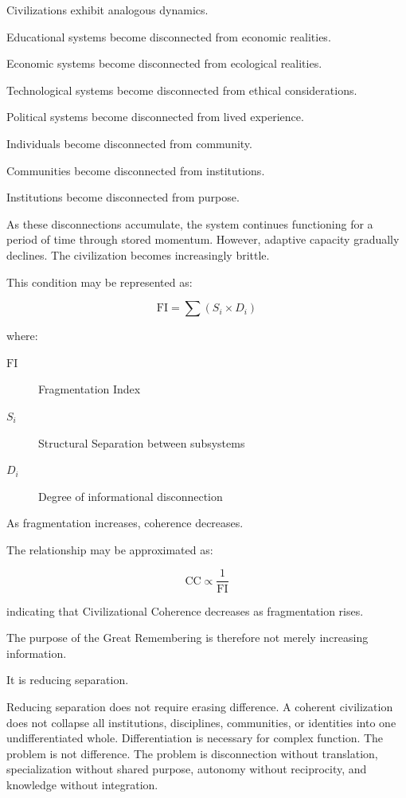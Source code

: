\documentclass[12pt]{article}
\begin{document}
Civilizations exhibit analogous dynamics.

Educational systems become disconnected from economic realities.

Economic systems become disconnected from ecological realities.

Technological systems become disconnected from ethical considerations.

Political systems become disconnected from lived experience.

Individuals become disconnected from community.

Communities become disconnected from institutions.

Institutions become disconnected from purpose.

As these disconnections accumulate, the system continues functioning for a period of time through stored momentum. However, adaptive capacity gradually declines. The civilization becomes increasingly brittle.

This condition may be represented as:

\[
\mathrm{FI}=\sum(S_i \times D_i)
\]

where:

\begin{description}
  \item[\(\mathrm{FI}\)] Fragmentation Index
  \item[\(S_i\)] Structural Separation between subsystems
  \item[\(D_i\)] Degree of informational disconnection
\end{description}

As fragmentation increases, coherence decreases.

The relationship may be approximated as:

\[
\mathrm{CC}\propto \frac{1}{\mathrm{FI}}
\]

indicating that Civilizational Coherence decreases as fragmentation rises.

The purpose of the Great Remembering is therefore not merely increasing information.

It is reducing separation.

Reducing separation does not require erasing difference. A coherent civilization does not collapse all institutions, disciplines, communities, or identities into one undifferentiated whole. Differentiation is necessary for complex function. The problem is not difference. The problem is disconnection without translation, specialization without shared purpose, autonomy without reciprocity, and knowledge without integration.
\end{document}
